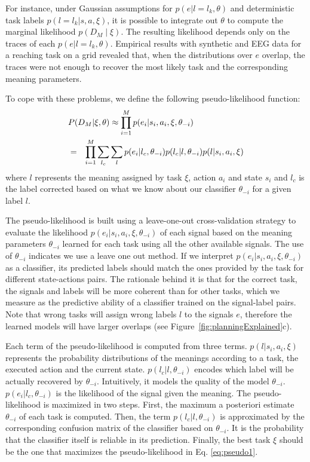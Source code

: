 For instance, under Gaussian assumptions for $p(e |l = l_k, \theta)$ and deterministic task labels $p(l = l_k| s, a, \xi)$, it is possible to integrate out  $\theta$ to compute the marginal likelihood $p(D_M\mid \xi)$. The resulting likelihood depends only on the traces of each $p(e |l = l_k, \theta)$. Empirical results with synthetic and EEG data for a reaching task on a grid revealed that, when the distributions over $e$ overlap, the traces were not enough to recover the most likely task and the corresponding meaning parameters. 

To cope with these problems, we define the following pseudo-likelihood function:
%
\begin{eqnarray}\label{eq:pseudo1}
\lefteqn{P(D_M | \xi, \theta) \approx \prod_{i=1}^M p(e_i | s_i, a_i, \xi, \theta_{-i})}  \\ \label{eq:pseudo2}
&=& \prod_{i=1}^M \sum_{l_c}\sum_l  p(e_i | l_c, \theta_{-i})  p(l_c | l, \theta_{-i}) p(l|s_i,a_i,\xi)
\label{eq:}
\end{eqnarray}
%
where $l$ represents the meaning assigned by task $\xi$, action $a_i$ and state $s_i$ and $l_c$ is the label corrected based on what we know about our classifier $\theta_{-i}$ for a given label $l$.

The pseudo-likelihood is built using a leave-one-out cross-validation strategy to evaluate the likelihood $p(e_i | s_i, a_i, \xi, \theta_{-i})$ of each signal based on the meaning parameters $\theta_{-i}$ learned for each task using all the other available signals. The use of $\theta_{-i}$ indicates we use a leave one out method. If we interpret $p(e_i | s_i,a_i,\xi,\theta_{-i})$ as a classifier, its predicted labels should match the ones provided by the task for different state-actions pairs. The rationale behind it is that for the correct task, the signals and labels will be more coherent than for other tasks, which we measure as the predictive ability of a classifier trained on the signal-label pairs. Note that wrong tasks will assign wrong labels $l$ to the signals $e$, therefore the learned models will have larger overlaps (see Figure~\ref{fig:planningExplained}c). 

Each term of the pseudo-likelihood is computed from three terms. $p(l|s_i,a_i,\xi)$ represents the probability distributions of the meanings according to a task, the executed action and the current state.   $p(l_c | l, \theta_{-i})$ encodes which label will be actually recovered by $\theta_{-i}$. Intuitively, it models the quality of the model $\theta_{-i}$. $p(e_i | l_c,\theta_{-i})$ is the likelihood of the signal given the meaning. 
%
The pseudo-likelihood is maximized in two steps. First, the maximum a posteriori estimate $\theta_{-i}$ of each task is computed. Then, the term $p(l_c | l, \theta_{-i})$ is approximated by the corresponding confusion matrix of the classifier based on $\theta_{-i}$. It is the probability that the classifier itself is reliable in its prediction. Finally, the best task $\xi$ should be the one that maximizes the pseudo-likelihood in Eq. \ref{eq:pseudo1}.

